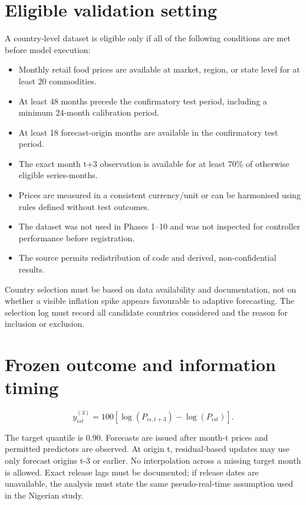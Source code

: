 \documentclass[11pt,a4paper]{article}
\begin{document}
\section{Eligible validation setting}\label{eligible-validation-setting}

A country-level dataset is eligible only if all of the following conditions are met before model execution:

\begin{itemize}
\item Monthly retail food prices are available at market, region, or state level for at least 20 commodities.
\item At least 48 months precede the confirmatory test period, including a minimum 24-month calibration period.
\item At least 18 forecast-origin months are available in the confirmatory test period.
\item The exact month t+3 observation is available for at least 70\% of otherwise eligible series-months.
\item Prices are measured in a consistent currency/unit or can be harmonised using rules defined without test outcomes.
\item The dataset was not used in Phases 1--10 and was not inspected for controller performance before registration.
\item The source permits redistribution of code and derived, non-confidential results.
\end{itemize}

Country selection must be based on data availability and documentation,
not on whether a visible inflation spike appears favourable to adaptive
forecasting. The selection log must record all candidate countries
considered and the reason for inclusion or exclusion.

\section{Frozen outcome and information timing}\label{frozen-outcome-and-information-timing}

\[
y_{ist}^{(3)}=100\left[\log(P_{is,t+3})-\log(P_{ist})\right].
\]

The target quantile is 0.90. Forecasts are issued after month-t prices
and permitted predictors are observed. At origin t, residual-based
updates may use only forecast origins t-3 or earlier. No interpolation
across a missing target month is allowed. Exact release lags must be
documented; if release dates are unavailable, the analysis must state
the same pseudo-real-time assumption used in the Nigerian study.
\end{document}
